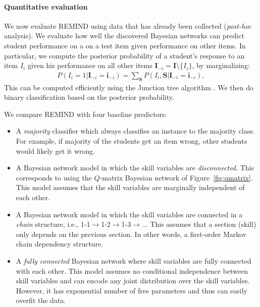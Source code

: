 \documentclass{edm_template}
\begin{document}
{	\paragraph{Quantitative evaluation}
	\label{sec:assessment_quantitative}
	
	We now evaluate  REMIND using data  that has already been collected (\textit{post-hoc} analysis). %
	We evaluate how well the discovered Bayesian networks can predict  student performance on a 
	on a test item given performance on other items.
	In particular, we compute the posterior probability of a student's response to an item $I_i$ given his performance on all other items 
	$\mathbf{I}_{-i}=\mathbf{I}\setminus\{I_i\}$, by marginalizing:
	\begin{align}
		P(I_i=1|\mathbf{I}_{-i}=\mathbf{i}_{-i}) =\sum_{\mathbf{S}}P(I_i, \mathbf{S}|\mathbf{I}_{-i}=\mathbf{i}_{-i}),
	\end{align}
	This can be computed efficiently using the Junction tree algorithm \cite{koller2009probabilistic}. 
	We then do binary classification based on the posterior probability.
	
	We compare REMIND with four baseline predictors:
	\begin{itemize}
		\item  A \emph{majority} classifier which always classifies  an instance to the majority class.
		For example, if majority of the students get an item wrong, other students would likely get it wrong.
		\item  A Bayesian network model in which the skill variables are \emph{disconnected}. 
		This corresponds to using the $Q$-matrix  Bayesian network of Figure~\ref{fig:qmatrix}.
		This model assumes that the skill variables are marginally independent of each other.
		\item A Bayesian network model in which the skill variables are connected in a \emph{chain} structure, i.e., 1-1$\rightarrow$1-2$\rightarrow$1-3$\rightarrow\dots$
		This assumes that a section (skill) only depends on the previous section.
		In other words, a first-order Markov chain dependency structure.
		\item A \emph{fully connected} Bayesian network where skill variables are fully connected with each other.
		This model assumes no conditional independence between skill variables and can encode any joint distribution over the skill variables.
		However, it has exponential number of free parameters and thus can easily overfit the data.
	\end{itemize}
	
}
\end{document}
